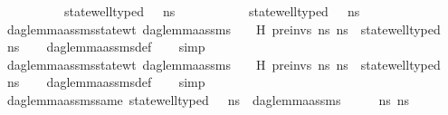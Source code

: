 \begin{isabellebody}
\ \ \ \ \ \ \ \ \ \ state{\isacharunderscore}{\kern0pt}well{\isacharunderscore}{\kern0pt}typed\ {\isasymLambda}\ {\isasymOmega}\ ns{}\ {\isasymand}\isanewline
\ \ \ \ \ \ \ \ \ \ state{\isacharunderscore}{\kern0pt}well{\isacharunderscore}{\kern0pt}typed\ {\isasymLambda}\ {\isasymOmega}\ ns{}{\isachardoublequoteclose}\isanewline
\isanewline
{}\isamarkupfalse%
\ dag{\isacharunderscore}{\kern0pt}lemma{\isacharunderscore}{\kern0pt}assms{\isacharunderscore}{\kern0pt}state{\isacharunderscore}{\kern0pt}wt{\isacharunderscore}{\kern0pt}{}{\isacharcolon}{\kern0pt}\ {\isachardoublequoteopen}dag{\isacharunderscore}{\kern0pt}lemma{\isacharunderscore}{\kern0pt}assms\ {\isasymLambda}\ {\isasymGamma}\ {\isasymOmega}\ H\ pre{\isacharunderscore}{\kern0pt}invs\ ns{}\ ns{}\ {\isasymLongrightarrow}\ state{\isacharunderscore}{\kern0pt}well{\isacharunderscore}{\kern0pt}typed\ {\isasymLambda}\ {\isasymOmega}\ ns{}{\isachardoublequoteclose}\isanewline
%
\isadelimproof
\ \ %
\endisadelimproof
%
\isatagproof
{}\isamarkupfalse%
\ dag{\isacharunderscore}{\kern0pt}lemma{\isacharunderscore}{\kern0pt}assms{\isacharunderscore}{\kern0pt}def\isanewline
\ \ \isamarkupfalse%
\ simp%
\endisatagproof
{\isafoldproof}%
%
\isadelimproof
\isanewline
%
\endisadelimproof
\isanewline
{}\isamarkupfalse%
\ dag{\isacharunderscore}{\kern0pt}lemma{\isacharunderscore}{\kern0pt}assms{\isacharunderscore}{\kern0pt}state{\isacharunderscore}{\kern0pt}wt{\isacharunderscore}{\kern0pt}{}{\isacharcolon}{\kern0pt}\ {\isachardoublequoteopen}dag{\isacharunderscore}{\kern0pt}lemma{\isacharunderscore}{\kern0pt}assms\ {\isasymLambda}\ {\isasymGamma}\ {\isasymOmega}\ H\ pre{\isacharunderscore}{\kern0pt}invs\ ns{}\ ns{}\ {\isasymLongrightarrow}\ state{\isacharunderscore}{\kern0pt}well{\isacharunderscore}{\kern0pt}typed\ {\isasymLambda}\ {\isasymOmega}\ ns{}{\isachardoublequoteclose}\isanewline
%
\isadelimproof
\ \ %
\endisadelimproof
%
\isatagproof
{}\isamarkupfalse%
\ dag{\isacharunderscore}{\kern0pt}lemma{\isacharunderscore}{\kern0pt}assms{\isacharunderscore}{\kern0pt}def\isanewline
\ \ \isamarkupfalse%
\ simp%
\endisatagproof
{\isafoldproof}%
%
\isadelimproof
\isanewline
%
\endisadelimproof
\isanewline
{}\isamarkupfalse%
\ dag{\isacharunderscore}{\kern0pt}lemma{\isacharunderscore}{\kern0pt}assms{\isacharunderscore}{\kern0pt}same{\isacharcolon}{\kern0pt}\ {\isachardoublequoteopen}state{\isacharunderscore}{\kern0pt}well{\isacharunderscore}{\kern0pt}typed\ {\isasymLambda}\ {\isasymOmega}\ ns{}\ {\isasymLongrightarrow}\ dag{\isacharunderscore}{\kern0pt}lemma{\isacharunderscore}{\kern0pt}assms\ {\isasymLambda}\ {\isasymGamma}\ {\isasymOmega}\ {\isacharbrackleft}{\kern0pt}{\isacharbrackright}{\kern0pt}\ {\isacharbrackleft}{\kern0pt}{\isacharbrackright}{\kern0pt}\ ns{}\ ns{}{\isachardoublequoteclose}\isanewline

\end{isabellebody}
